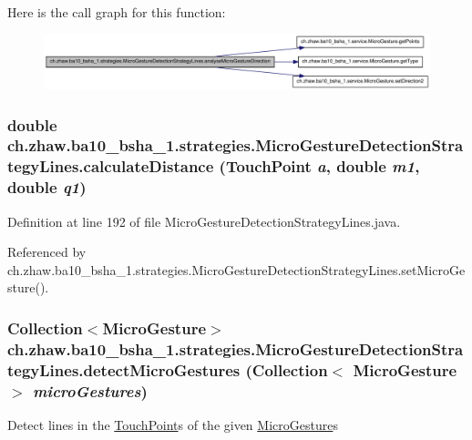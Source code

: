 Here is the call graph for this function:\nopagebreak
\begin{figure}[H]
\begin{center}
\leavevmode
\includegraphics[width=403pt]{classch_1_1zhaw_1_1ba10__bsha__1_1_1strategies_1_1MicroGestureDetectionStrategyLines_a3eed9607540b8b73f0dd0f77b841a9c7_cgraph}
\end{center}
\end{figure}
\hypertarget{classch_1_1zhaw_1_1ba10__bsha__1_1_1strategies_1_1MicroGestureDetectionStrategyLines_a752e22e2803dd97ddea5ce9ba6ce9071}{
\subsubsection[{calculateDistance}]{\setlength{\rightskip}{0pt plus 5cm}double ch.zhaw.ba10\_\-bsha\_\-1.strategies.MicroGestureDetectionStrategyLines.calculateDistance ({\bf TouchPoint} {\em a}, \/  double {\em m1}, \/  double {\em q1})}}
\label{classch_1_1zhaw_1_1ba10__bsha__1_1_1strategies_1_1MicroGestureDetectionStrategyLines_a752e22e2803dd97ddea5ce9ba6ce9071}


Definition at line 192 of file MicroGestureDetectionStrategyLines.java.

Referenced by ch.zhaw.ba10\_\-bsha\_\-1.strategies.MicroGestureDetectionStrategyLines.setMicroGesture().\hypertarget{classch_1_1zhaw_1_1ba10__bsha__1_1_1strategies_1_1MicroGestureDetectionStrategyLines_ac4a6ad22e6ca3b595006c0b956fdd208}{
\subsubsection[{detectMicroGestures}]{\setlength{\rightskip}{0pt plus 5cm}Collection$<${\bf MicroGesture}$>$ ch.zhaw.ba10\_\-bsha\_\-1.strategies.MicroGestureDetectionStrategyLines.detectMicroGestures (Collection$<$ {\bf MicroGesture} $>$ {\em microGestures})}}
\label{classch_1_1zhaw_1_1ba10__bsha__1_1_1strategies_1_1MicroGestureDetectionStrategyLines_ac4a6ad22e6ca3b595006c0b956fdd208}
Detect lines in the \hyperlink{classch_1_1zhaw_1_1ba10__bsha__1_1_1TouchPoint}{TouchPoint}s of the given \hyperlink{}{MicroGesture}s



